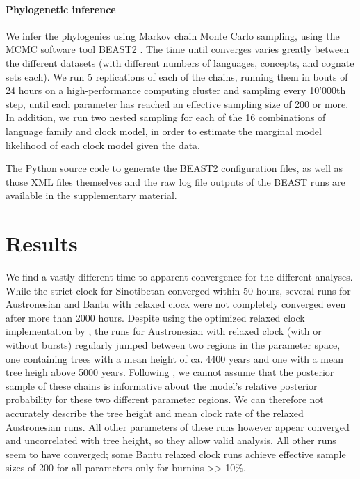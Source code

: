 \documentclass[a4paper,12pt]{scrartcl}
\begin{document}
\paragraph{Phylogenetic inference}
We infer the phylogenies using Markov chain Monte Carlo sampling, using the MCMC
software tool BEAST2 \parencite{beast2}. The time until converges varies greatly
between the different datasets (with different numbers of languages, concepts, and
cognate sets each).
We run 5 replications of each of the chains, running them in bouts of 24 hours on a high-performance
computing cluster and sampling every 10'000th step, until each parameter has reached an effective sampling size of 
200 or more.
In addition, we run two nested sampling for each of the 16 combinations of
language family and clock model, in order to estimate the marginal model likelihood
of each clock model given the data.

The Python source code to generate the BEAST2 configuration files, as well as
those XML files themselves and the raw log file outputs of the BEAST runs are
available in the supplementary material.

\section{Results}
We find a vastly different time to apparent convergence for the different
analyses. While the strict clock for Sinotibetan converged within 50 hours,
several runs for Austronesian and Bantu with relaxed clock were not completely
converged even after more than 2000 hours. Despite using the optimized relaxed clock
implementation by \textcite{orc}, the runs for Austronesian with relaxed clock
(with or without bursts) regularly jumped between two regions in the parameter
space, one containing trees with a mean height of ca. 4400 years and one with a
mean tree heigh above 5000 years. Following \parencite{bad-mixing}, we cannot
assume that the posterior sample of these chains is informative about the
model's relative posterior probability for these two different parameter regions.
We can therefore not accurately describe the tree height and mean clock rate of
the relaxed Austronesian runs. All other parameters of these runs however appear
converged and uncorrelated with tree height, so they allow valid analysis.
All other runs seem to have converged; some Bantu relaxed clock runs achieve
effective sample sizes of 200 for all parameters only for burnins >> 10\%.
\end{document}

